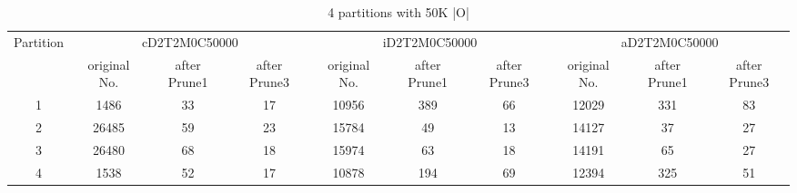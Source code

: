 \begin{table*}[t]
  \centering
\makeatletter
    \long{}
\makeatother
  \caption{4 partitions with 50K |O|}
    \vspace*{3pt}
  \footnotesize

  \label{table:partition4}
  \begin{tabular}{|c||c|c|c|c|c|c|c|c|c|}
  \hline
  \multirow{2}{*}{Partition} &  \multicolumn{3}{|c|}{cD2T2M0C50000} & \multicolumn{3}{|c|}{iD2T2M0C50000} &\multicolumn{3}{|c|}{aD2T2M0C50000} \\\cline{2-10}
    &  original No. & after Prune1 & after Prune3 & original No. & after Prune1 & after Prune3 & original No. & after Prune1 & after Prune3\\\hline\hline

\cline{2-10}
    1 &  1486 & 33 & 17 & 10956 & 389 & 66 & 12029 & 331 & 83 \\\hline

\cline{2-10}
    2 &  26485 & 59 & 23 & 15784 & 49 & 13 & 14127 & 37 & 27 \\\hline

\cline{2-10}
    3 &  26480 & 68 & 18 & 15974 & 63 & 18 & 14191 & 65 & 27 \\\hline
    
\cline{2-10}
    4 &  1538 & 52 & 17 & 10878 & 194 & 69 & 12394 & 325 & 51 \\\hline
    
  \end{tabular}
  \vspace*{-17pt}
\end{table*}

